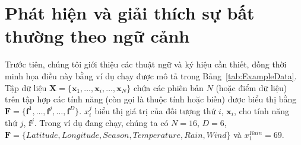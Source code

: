 \section{Phát hiện và giải thích sự bất thường theo ngữ cảnh}
\label{sec:framework}

Trước tiên, chúng tôi giới thiệu các thuật ngữ và ký hiệu cần thiết, đồng thời minh họa điều này bằng ví dụ chạy được mô tả trong Bảng~\ref{tab:ExampleData}. Tập dữ liệu $\mathbf{X} =\{\mathbf{x}_{1},\ldots,\mathbf{x}_{i},\ldots,\mathbf{x}_{N}\}$ chứa các phiên bản $N$ (hoặc điểm dữ liệu) trên tập hợp các tính năng (còn gọi là thuộc tính hoặc biến) được biểu thị bằng $\mathbf{F} = \{\mathbf{f}^{1},\ldots,\mathbf{f}^{j},\ldots,\mathbf{f}^{D}\}$. $x_{i}^{j}$ biểu thị giá trị của đối tượng thứ $i$, $\mathbf{x}_{i}$, cho tính năng thứ $j$, $\mathbf{f}^{j}$. Trong ví dụ đang chạy, chúng ta có $N=16$, $D=6$, $\mathbf{F}= \{Latitude, Longitude, Season, Temperature, Rain, Wind\}$ và $x_{1}^{Rain} = 69$.

